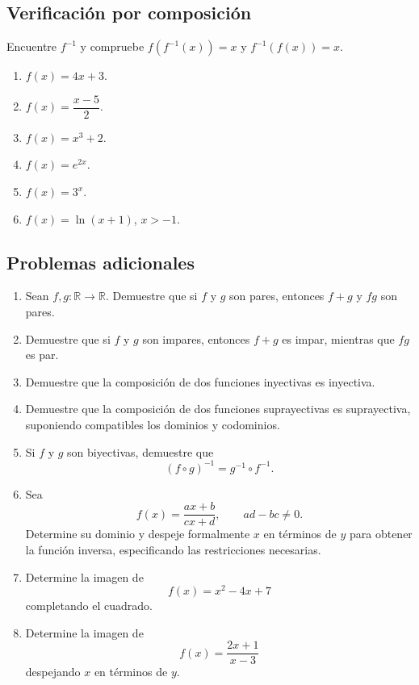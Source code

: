 \documentclass[12pt]{article}
\theoremstyle{remark}
\newcommand{\R}{\mathbb{R}}
\begin{document}
\subsection*{Verificación por composición}
Encuentre $f^{-1}$ y compruebe $f(f^{-1}(x))=x$ y $f^{-1}(f(x))=x$.
\begin{enumerate}
\item $f(x)=4x+3$.
\item $f(x)=\dfrac{x-5}{2}$.
\item $f(x)=x^3+2$.
\item $f(x)=e^{2x}$.
\item $f(x)=3^x$.
\item $f(x)=\ln(x+1)$, $x>-1$.
\end{enumerate}



\subsection*{Problemas adicionales}
\begin{enumerate}
    \item Sean $f,g:\R\to\R$. Demuestre que si $f$ y $g$ son pares, entonces
    $f+g$ y $fg$ son pares.

    \item Demuestre que si $f$ y $g$ son impares, entonces $f+g$ es impar,
    mientras que $fg$ es par.

    \item Demuestre que la composición de dos funciones inyectivas es
    inyectiva.

    \item Demuestre que la composición de dos funciones suprayectivas es
    suprayectiva, suponiendo compatibles los dominios y codominios.

    \item Si $f$ y $g$ son biyectivas, demuestre que
    \[
    (f\circ g)^{-1}=g^{-1}\circ f^{-1}.
    \]

    \item Sea
    \[
    f(x)=\frac{ax+b}{cx+d},
    \qquad ad-bc\neq0.
    \]
    Determine su dominio y despeje formalmente $x$ en términos de $y$ para
    obtener la función inversa, especificando las restricciones necesarias.

    \item Determine la imagen de
    \[
    f(x)=x^2-4x+7
    \]
    completando el cuadrado.

    \item Determine la imagen de
    \[
    f(x)=\frac{2x+1}{x-3}
    \]
    despejando $x$ en términos de $y$.
\end{enumerate}
\end{document}
